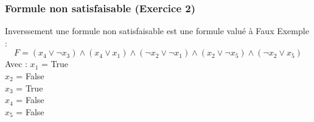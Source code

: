 \documentclass{article}
\begin{document}
    \subsubsection{Formule non satisfaisable (Exercice 2)}
    Inverssement une formule non satisfaisable est une formule valué à Faux
    Exemple : \\
    \begin{equation*}
        F=(x_4 \lor \neg x_3) \wedge (x_4 \lor x_1) \wedge (\neg x_2 \lor \neg x_1) \wedge (x_2 \lor \neg x_5) \wedge (\neg x_2 \lor x_5)
    \end{equation*}
    Avec :
    $x_1$ = True \\
    $x_2$ = False \\
    $x_3$ = True \\
    $x_4$ = False \\ 
    $x_5$ = False \\
\end{document}
